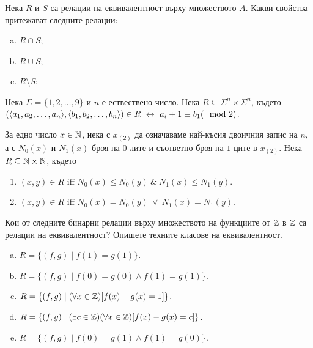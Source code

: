 \begin{problem}
  Нека $R$ и $S$ са релации на еквивалентност върху множеството $A$.
  Какви свойства притежават следните релации:
  \begin{enumerate}[a)]
  \item
    $R \cap S$;
  \item
    $R \cup S$;
  \item
    $R \setminus S$;
  \end{enumerate}
\end{problem}

\begin{problem}
  Нека $\Sigma = \{1,2,\dots,9\}$ и $n$ е ествествено число.
  Нека $R \subseteq \Sigma^n \times \Sigma^n$, където
  $(\langle{a_1,a_2,\dots,a_n}\rangle,\langle{b_1,b_2,\dots,b_n}\rangle) \in R \ \leftrightarrow\  a_i + 1 \equiv b_1 (\mod 2)$.
\end{problem}

\begin{problem}
  За едно число $x \in \mathbb{N}$, нека с $x_{(2)}$ да означаваме най-късия двоичния запис на $n$,
  а с $N_0(x)$ и $N_1(x)$ броя на $0$-лите и съответно броя на $1$-ците в $x_{(2)}$.
  Нека $R \subseteq \mathbb{N}\times\mathbb{N}$, където
  \begin{enumerate}
  \item 
    $(x,y) \in R$ iff $N_0(x) \leq N_0(y)\ \&\ N_1(x) \leq N_1(y)$.
  \item
    $(x,y) \in R$ iff $N_0(x) = N_0(y)\ \vee\ N_1(x) = N_1(y)$.
  \end{enumerate}
\end{problem}



\begin{problem}
  Кои от следните бинарни релации върху множеството на функциите от $\mathbb{Z}$ в $\mathbb{Z}$
  са релации на еквивалентност? Опишете техните класове на еквивалентност.
  \begin{enumerate}[a)]
  \item
    $R = \{(f,g)\mid f(1) = g(1)\}$.
  \item
    $R = \{(f,g)\mid f(0) = g(0)\wedge f(1) = g(1)\}$.
  \item
    $R =\{(f,g)\mid (\forall x\in\mathbb{Z})[f(x)-g(x) = 1]\}$.
  \item
    $R = \{(f,g)\mid (\exists c\in\mathbb{Z})(\forall x\in\mathbb{Z})[f(x)-g(x) = c]\}$.
  \item
    $R = \{(f,g)\mid f(0) = g(1)\wedge f(1) = g(0)\}$.
  \end{enumerate}
\end{problem}

